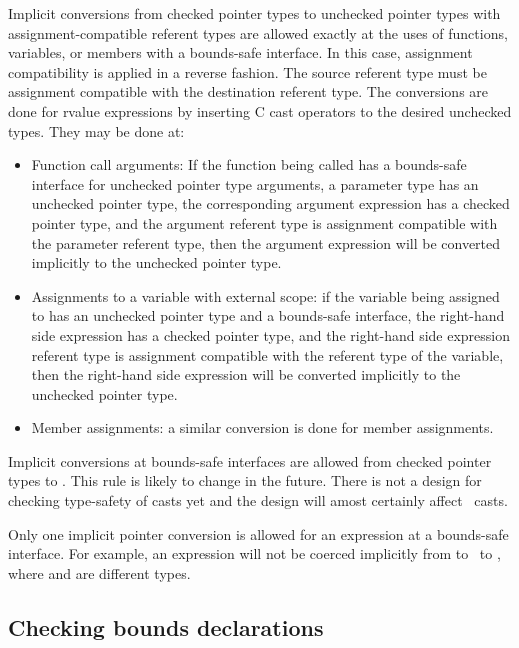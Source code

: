 Implicit conversions from checked pointer types to unchecked pointer types
with assignment-compatible referent types are allowed exactly at the uses of functions,
variables, or members with a  bounds-safe interface.  In this case, assignment
compatibility is applied in a reverse fashion.  The source referent type must be
assignment compatible with the destination referent type.  The conversions are done for rvalue expressions by inserting C cast operators to the desired unchecked types.
They may be done at:
\begin{itemize}
\item Function call arguments: If the function being called has a
      bounds-safe interface for unchecked pointer type arguments, a parameter
      type has an unchecked pointer type, the corresponding argument expression
      has a checked pointer type, and the argument referent type is assignment
      compatible with the parameter referent type, then the argument expression
      will be converted implicitly to the unchecked pointer type.
\item Assignments to a variable with external scope: if the variable being
     assigned to has an unchecked pointer type and a bounds-safe interface, the
     right-hand side expression has a checked pointer type, and the right-hand
     side expression referent type is assignment compatible with the referent
     type of the variable, then the right-hand side expression will be converted
     implicitly to the unchecked pointer type.
\item
   Member assignments: a similar conversion is done for member assignments.
\end{itemize}

Implicit conversions at bounds-safe interfaces are allowed from checked pointer types to
\uncheckedptrvoid.  This rule is likely to change in the future.  There is not a  design for
checking type-safety of casts yet and the design will amost certainly affect 
\uncheckedptrvoid\ casts.

Only one implicit pointer conversion is allowed for an expression at a bounds-safe
interface.  For example, an expression will not be
coerced implicitly from  to \uncheckedptrvoid\ to
, where  and  are different types.


\subsection{Checking bounds declarations}
\label{section:checking-bounds-interfaces}

